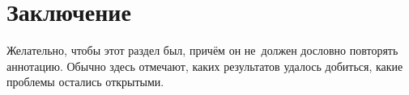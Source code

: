 \documentclass[12pt, twoside]{article}
\begin{document}
\section{Заключение}
Желательно, чтобы этот раздел был, причём он не~должен дословно повторять аннотацию.
Обычно здесь отмечают, каких результатов удалось добиться, какие проблемы остались открытыми.


\end{document}
